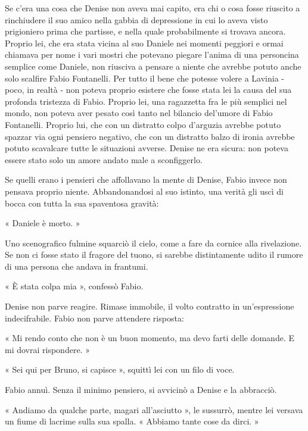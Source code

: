 Se c'era una cosa che Denise non aveva mai capito, era chi o cosa fosse riuscito a rinchiudere il suo amico nella gabbia di depressione in cui lo aveva visto prigioniero prima che partisse, e nella quale probabilmente si trovava ancora. Proprio lei, che era stata vicina al suo Daniele nei momenti peggiori e ormai chiamava per nome i vari mostri che potevano piegare l'anima di una personcina semplice come Daniele, non riusciva a pensare a niente che avrebbe potuto anche solo scalfire Fabio Fontanelli. Per tutto il bene che potesse volere a Lavinia - poco, in realtà - non poteva proprio esistere che fosse stata lei la causa del sua profonda tristezza di Fabio. Proprio lei, una ragazzetta fra le più semplici nel mondo, non poteva aver pesato così tanto nel bilancio del'umore di Fabio Fontanelli. Proprio lui, che con un distratto colpo d'arguzia avrebbe potuto spazzar via ogni pensiero negativo, che con un distratto balzo di ironia avrebbe potuto scavalcare tutte le situazioni avverse. Denise ne era sicura: non poteva essere stato solo un amore andato male a sconfiggerlo.

Se quelli erano i pensieri che affollavano la mente di Denise, Fabio invece non pensava proprio niente. Abbandonandosi al suo istinto, una verità gli uscì di bocca con tutta la sua spaventosa gravità:

« Daniele è morto. »

Uno scenografico fulmine squarciò il cielo, come a fare da cornice alla rivelazione. Se non ci fosse stato il fragore del tuono, si sarebbe distintamente udito il rumore di una persona che andava in frantumi.

« È stata colpa mia », confessò Fabio.

Denise non parve reagire. Rimase immobile, il volto contratto in un'espressione indecifrabile. Fabio non parve attendere risposta:

« Mi rendo conto che non è un buon momento, ma devo farti delle domande. E mi dovrai rispondere. »

« Sei qui per Bruno, si capisce », squittì lei con un filo di voce.

Fabio annuì. Senza il minimo pensiero, si avvicinò a Denise e la abbracciò.

« Andiamo da qualche parte, magari all'asciutto », le sussurrò, mentre lei versava un fiume di lacrime sulla sua spalla. « Abbiamo tante cose da dirci. »

